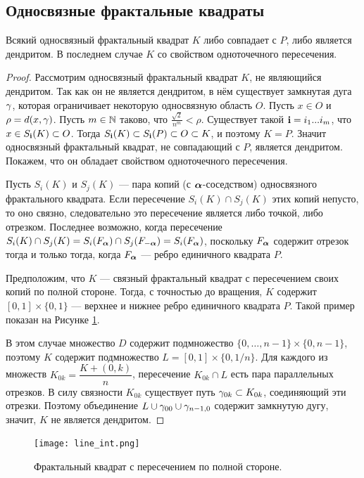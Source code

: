 \subsection{Односвязные фрактальные квадраты}

\begin{theorem}
\label{thm:den_necessary_sufficient}
Всякий односвязный фрактальный квадрат $K$ либо совпадает с $P$, либо является дендритом.
В последнем случае $K$ со свойством одноточечного пересечения.
\end{theorem}

\begin{proof}
Рассмотрим односвязный фрактальный квадрат $K$, не являющийся дендритом.
Так как он не является дендритом, в нём существует замкнутая дуга $\gamma$, которая ограничивает некоторую односвязную область $O$. 
Пусть $x\in O$ и $\rho=d(x,\gamma)$.
Пусть $m\in\mathbb{N}$ таково, что $\frac{\sqrt{2}}{n^m}<\rho$.
Существует такой ${\bf{i}}=i_1...i_m$, что $x\in S_{\bf{i}}(K)\subset O$.
Тогда $S_{\bf{i}}(K)\subset S_{\bf{i}}(P)\subset O\subset K$, и поэтому $K=P$.
Значит односвязный фрактальный квадрат, не совпадающий с $P$, является дендритом.
Покажем, что он обладает свойством одноточечного пересечения.

Пусть $S_i(K)$ и $S_j(K)$ --- пара копий (с ${\bm{\alpha}}$-соседством) односвязного фрактального квадрата.
Если пересечение $S_i(K)\cap S_j(K)$ этих копий непусто, то оно связно, следовательно это пересечение  является либо точкой, либо отрезком.
Последнее возможно, когда пересечение $S_i(K)\cap S_j(K)=S_i(F_{\bm{\alpha}})\cap S_j(F_{-{\bm{\alpha}}})=S_i(F_{\bm{\alpha}})$, поскольку $F_{\bm{\alpha}}$ содержит отрезок тогда и только тогда, когда $F_{\bm{\alpha}}$ --- ребро единичного квадрата $P$. 

Предположим, что $K$ --- связный фрактальный квадрат с пересечением своих копий по полной стороне. 
Тогда, с точностью до вращения, $K$ содержит $[0,1]\times\{0,1\}$  --- верхнее и нижнее ребро единичного квадрата $P$.
Такой пример показан на Рисунке \ref{fig:line_int}.

В этом случае множество $D$ содержит подмножество $ \{0,\ldots,n-1\}\times \{0,n-1\}$, поэтому $K$ содержит подмножество $L=[0,1]\times\{0,1/n\}$. 
Для каждого из множеств $K_{0k}=\dfrac{K+(0,k)}{n}$, пересечение $K_{0k}\cap L$ есть пара параллельных отрезков. 
В силу связности $K_{0k}$ существует путь $\gamma_{0k}\subset K_{0k}$, соединяющий эти  отрезки. 
Поэтому объединение $L\cup\gamma_{00}\cup\gamma_{n-1,0}$ содержит замкнутую дугу, значит, $K$ не является дендритом. 
\end{proof}

\begin{figure}[H]
 \centering
 \texttt{[image: line\_int.png]}
 \caption{Фрактальный квадрат с пересечением по полной стороне.}
 \label{fig:line_int}
\end{figure}

